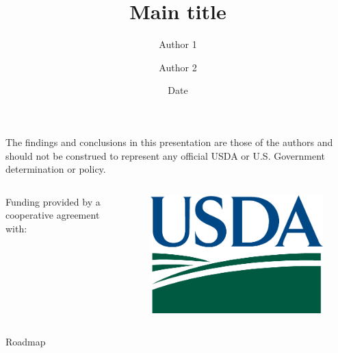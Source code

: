 \documentclass[usenames,dvipsnames]{beamer}
\title[Short title for footer]{Main title}
\author[Author cite in footer]{
            Author 1 \inst{1}
            \and Author 2 \inst{1}
            }
\institute[]{
            \inst{1}%
            Dyson School of Applied Economics and Management | Cornell University   %
            }
\date{Date}
\begin{document}

\begin{frame}
    \titlepage %
\end{frame}



\begin{frame}{}
    \centering The findings and conclusions in this presentation are those of the authors and should not be construed to represent any official USDA or U.S. Government determination or policy.\\
    \vspace{10pt}
    \begin{columns}
       \begin{column}{0.5\textwidth}
    \centering   Funding provided by a cooperative agreement with:
       \end{column} 
       \begin{column}{0.5\textwidth}
    \begin{figure}
        \raggedright
        \includegraphics[width=0.7\linewidth]{Images/usda-logo-color.png}
    \end{figure}       
    \end{column} 
    \end{columns}
\end{frame}


\begin{frame}{Roadmap}
    \tableofcontents
\end{frame}
\end{document}
